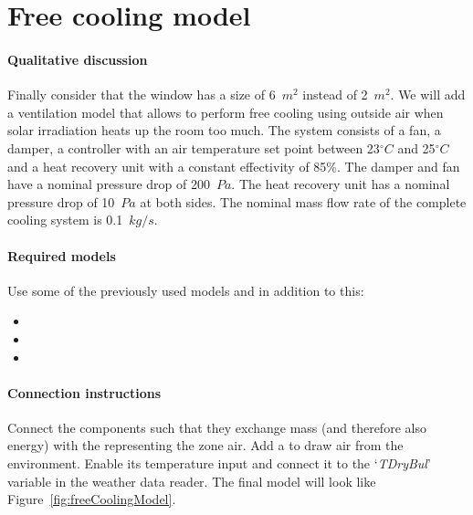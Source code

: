 \documentclass[10pt,a4paper]{article}
\begin{document}
\section{Free cooling model}
\paragraph{Qualitative discussion}
Finally consider that the window has a size of
6~$m^2$ instead of 2~$m^2$.
We will add a ventilation model that allows to
perform free cooling using outside air when
solar irradiation heats up the room too much.
The system consists of a fan,
a damper,
a controller with an air temperature 
set point between 23$^{\circ}C$ and 25$^{\circ}C$
and a heat recovery unit with a constant effectivity of 85\%.
The damper and fan have a nominal pressure drop of 200~$Pa$. The heat recovery unit has a nominal pressure drop of 10~$Pa$ at both sides.
The nominal mass flow rate of the complete cooling system is 0.1~$kg/s$.


\paragraph{Required models}
Use some of the previously used models and in addition to this:
\begin{itemize}
\item {}
\item {}
\item {}
\end{itemize}

\paragraph{Connection instructions}
Connect the components such that they exchange mass 
(and therefore also energy) with the 
representing the zone air.
Add a  to draw air from the environment.
Enable its temperature input and connect it to the `\textit{TDryBul}'
variable in the weather data reader. The final model will look like
Figure~\ref{fig:freeCoolingModel}.
\end{document}
